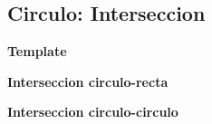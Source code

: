 \subsection{Circulo: Interseccion}
    \textbf{Template}
    

    \textbf{Interseccion circulo-recta}
    

    \textbf{Interseccion circulo-circulo}
    